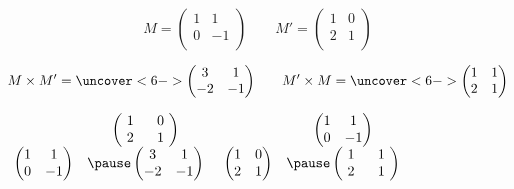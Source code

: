 \begin{frame}
\begin{exemple}
$$M=\left(\begin{matrix} 1 & 1 \\ 0 & -1 \\ \end{matrix}\right) \qquad 
M' = \left(\begin{matrix} 1 & 0 \\ 2 & 1 \\ \end{matrix}\right)$$

$$M\times M' = \uncover<6->{\left(\begin{matrix} 3 & 1 \\ -2 & -1 \\ \end{matrix}\right)} \qquad
M'\times M=  \uncover<6->{\left(\begin{matrix} 1 & 1 \\ 2 & 1 \\ \end{matrix}\right)}$$
\end{exemple}




\pause
\bigskip

$\begin{array}{cc}
& \left(\begin{matrix} \ 1\  & \ 0\  \\ \ 2\  & \ 1\  \\ \end{matrix}\right)\\
\left(\begin{matrix} 1 & 1 \\ 0 & -1 \\ \end{matrix}\right)  & 
\pause 
\left(\begin{matrix} 3 & 1 \\ -2 & -1 \\ \end{matrix}\right)
 \end{array}$
\qquad 
\pause
$\begin{array}{cc}
& \left(\begin{matrix} 1 & 1 \\ 0 & -1 \\ \end{matrix}\right) \\
\left(\begin{matrix} 1 & 0 \\ 2 & 1 \\ \end{matrix}\right) & 
\pause
\left(\begin{matrix} \ 1\  & \ 1\  \\ \ 2\  & \ 1\  \\ \end{matrix}\right) \\
 \end{array}$
\pause
\end{frame}


